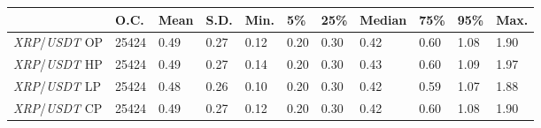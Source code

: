 \begin{tabular}{lllllllllll}
\toprule
 & \textbf{O.C.} & \textbf{Mean} & \textbf{S.D.} & \textbf{Min.} & \textbf{5\%} & \textbf{25\%} & \textbf{Median} & \textbf{75\%} & \textbf{95\%} & \textbf{Max.} \\
\midrule
\emph{XRP}/\emph{USDT} OP & 25424 & 0.49 & 0.27 & 0.12 & 0.20 & 0.30 & 0.42 & 0.60 & 1.08 & 1.90 \\
\emph{XRP}/\emph{USDT} HP & 25424 & 0.49 & 0.27 & 0.14 & 0.20 & 0.30 & 0.43 & 0.60 & 1.09 & 1.97 \\
\emph{XRP}/\emph{USDT} LP & 25424 & 0.48 & 0.26 & 0.10 & 0.20 & 0.30 & 0.42 & 0.59 & 1.07 & 1.88 \\
\emph{XRP}/\emph{USDT} CP & 25424 & 0.49 & 0.27 & 0.12 & 0.20 & 0.30 & 0.42 & 0.60 & 1.08 & 1.90 \\
\bottomrule
\end{tabular}
